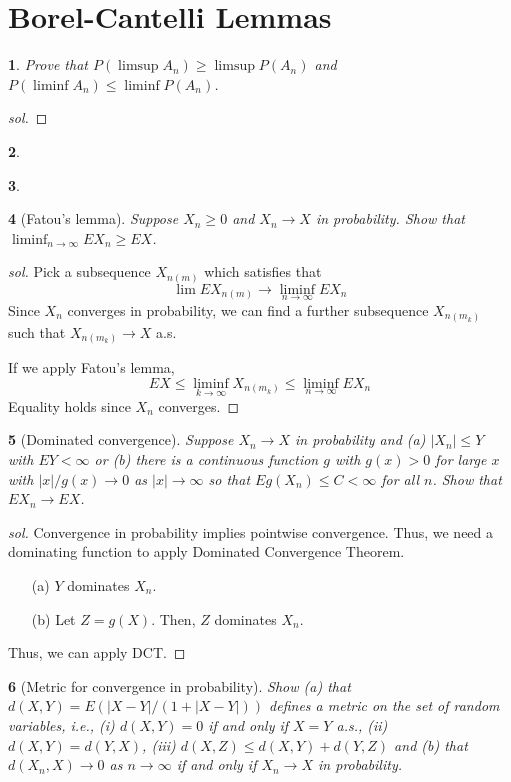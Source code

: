 \documentclass{report}
\newtheorem{ex}{}[section]
\begin{document}
\section{Borel-Cantelli Lemmas}
\begin{ex}
Prove that $P(\limsup A_n) \ge \limsup P(A_n)$ and $P(\liminf A_n) \le \liminf P(A_n)$.
\end{ex}
\begin{proof}[sol]
\end{proof}
\begin{ex}
\end{ex}
\begin{ex}
\end{ex}
\begin{ex}[Fatou's lemma]
Suppose $X_n \ge 0$ and $X_n \to X$ in probability. Show that $\liminf_{n\to\infty} EX_n \ge EX$.
\end{ex}
\begin{proof}[sol]
Pick a subsequence $X_{n(m)}$ which satisfies that
\[\lim EX_{n(m)} \to \liminf_{n\to\infty} EX_n \]
Since $X_n$ converges in probability, we can find a further subsequence $X_{n(m_k)}$ such that $X_{n(m_k)} \to X$ a.s.

If we apply Fatou's lemma,
\[EX \le \liminf_{k\to\infty} X_{n(m_k)} \le \liminf_{n\to\infty} EX_n\]
Equality holds since $X_n$ converges.
\end{proof}
\begin{ex}[Dominated convergence]
Suppose $X_n \to X$ in probability and (a) $|X_n| \le Y$ with $EY < \infty $ or (b) there is a continuous function $g$ with $g(x) > 0$ for large $x$ with $|x|/g(x) \to 0$ as $|x| \to \infty$ so that $Eg(X_n) \le C < \infty $ for all $n$. Show that $EX_n \to EX$.
\end{ex}
\begin{proof}[sol]
Convergence in probability implies pointwise convergence. Thus, we need a dominating function to apply Dominated Convergence Theorem.
\begin{enumerate}
	\item[(a)] $Y$ dominates $X_n$.
	\item[(b)] Let $Z = g(X)$. Then, $Z$ dominates $X_n$.
\end{enumerate}
Thus, we can apply DCT.
\end{proof}
\begin{ex}[Metric for convergence in probability]
Show (a) that $d(X,Y) = E(|X-Y|/(1+|X-Y|))$ defines a metric on the set of random variables, i.e., (i) $d(X,Y) = 0$ if and only if $X = Y$ a.s., (ii) $d(X,Y) = d(Y,X)$, (iii) $d(X,Z) \le d(X,Y) + d(Y,Z)$ and (b) that $d(X_n, X) \to 0$ as $n \to \infty$ if and only if $X_n \to X$ in probability.
\end{ex}
\end{document}
